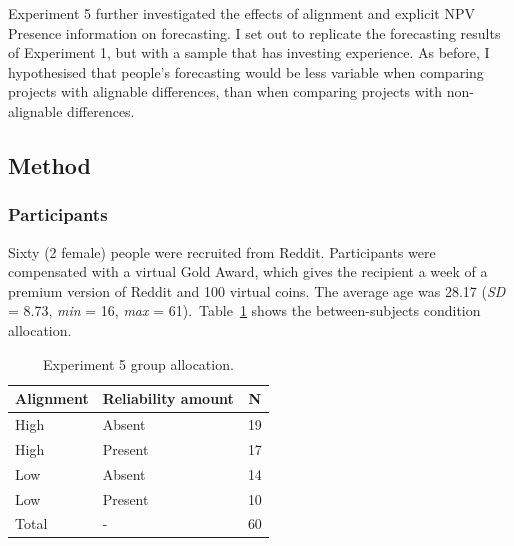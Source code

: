 \documentclass[a4paper, nobind, dvipsnames]{templates/ociamthesis}
\theoremstyle{definition}
\theoremstyle{definition}
\theoremstyle{definition}
\theoremstyle{definition}
\theoremstyle{remark}
\begin{document}
Experiment 5 further investigated the effects of alignment and explicit NPV
Presence information on forecasting. I set out to replicate the forecasting
results of Experiment 1, but with a sample that has investing experience. As
before, I hypothesised that people's forecasting would be less variable when
comparing projects with alignable differences, than when comparing projects with
non-alignable differences.

\hypertarget{method-13}{%
\subsection{Method}\label{method-13}}

\hypertarget{participants-11}{%
\subsubsection{Participants}\label{participants-11}}

Sixty (2 female) people were recruited from Reddit. Participants were compensated with a virtual Gold Award, which gives the recipient a week of a premium version of Reddit and 100 virtual coins. The average age was 28.17 (\emph{SD} = 8.73, \emph{min} = 16, \emph{max} = 61).~Table~\ref{tab:condition-allocation-alignment-4}
shows the between-subjects condition allocation.

\begin{table}[tbp]

\begin{center}
\begin{threeparttable}

\caption{\label{tab:condition-allocation-alignment-4}Experiment 5 group allocation.}

\begin{tabular}{lll}
\toprule
Alignment & \multicolumn{1}{c}{Reliability amount} & \multicolumn{1}{c}{N}\\
\midrule
High & Absent & 19\\
High & Present & 17\\
Low & Absent & 14\\
Low & Present & 10\\
Total & - & 60\\
\bottomrule
\end{tabular}

\end{threeparttable}
\end{center}

\end{table}
\end{document}

